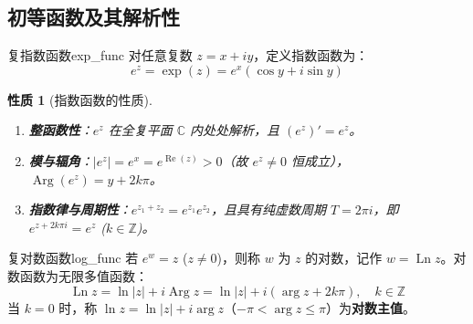 \documentclass[11pt,a4paper,fontset=fandol]{ctexart}
\newtheorem{property}[theorem]{性质}
\theoremstyle{remark}
\begin{document}
\subsection{初等函数及其解析性}

\begin{definition}{复指数函数}{exp_func}
对任意复数 $z = x + iy$，定义指数函数为：
\begin{equation}
    e^z = \exp(z) = e^x(\cos y + i\sin y)
\end{equation}
\end{definition}

\begin{property}[指数函数的性质]
\begin{enumerate}
    \item \textbf{整函数性}：$e^z$ 在全复平面 $\mathbb{C}$ 内处处解析，且 $(e^z)' = e^z$。
    \item \textbf{模与辐角}：$|e^z| = e^x = e^{\operatorname{Re}(z)} > 0$（故 $e^z \neq 0$ 恒成立），$\operatorname{Arg}(e^z) = y + 2k\pi$。
    \item \textbf{指数律与周期性}：$e^{z_1 + z_2} = e^{z_1}e^{z_2}$，且具有纯虚数周期 $T = 2\pi i$，即 $e^{z + 2k\pi i} = e^z$ ($k \in \mathbb{Z}$)。
\end{enumerate}
\end{property}

\begin{definition}{复对数函数}{log_func}
若 $e^w = z$ ($z \neq 0$)，则称 $w$ 为 $z$ 的对数，记作 $w = \operatorname{Ln} z$。对数函数为无限多值函数：
\begin{equation}
    \operatorname{Ln} z = \ln|z| + i\operatorname{Arg} z = \ln|z| + i(\arg z + 2k\pi), \quad k \in \mathbb{Z}
\end{equation}
当 $k = 0$ 时，称 $\ln z = \ln|z| + i\arg z$（$-\pi < \arg z \le \pi$）为\textbf{对数主值}。
\end{definition}
\end{document}
